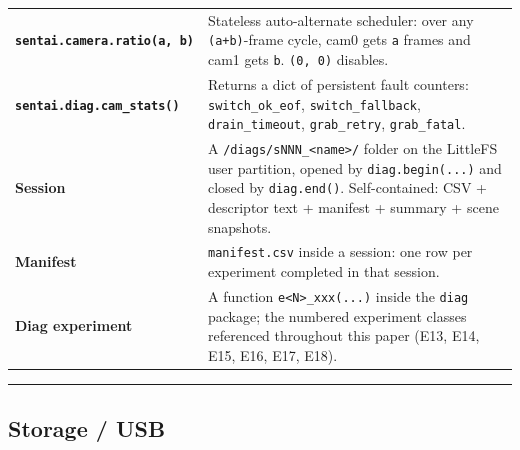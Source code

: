 {\begin{longtable}[]{@{}
  >{\raggedright\arraybackslash}p{}
  >{\raggedright\arraybackslash}p{}@{}}
\textbf{\texttt{sentai.camera.ratio(a,\ b)}} & Stateless auto-alternate
scheduler: over any \texttt{(a+b)}-frame cycle, cam0 gets \texttt{a}
frames and cam1 gets \texttt{b}. \texttt{(0,\ 0)} disables. \\
\textbf{\texttt{sentai.diag.cam\_stats()}} & Returns a dict of
persistent fault counters: \texttt{switch\_ok\_eof},
\texttt{switch\_fallback}, \texttt{drain\_timeout},
\texttt{grab\_retry}, \texttt{grab\_fatal}. \\
\textbf{Session} & A
\texttt{/diags/sNNN\_\textless{}name\textgreater{}/} folder on the
LittleFS user partition, opened by \texttt{diag.begin(...)} and closed
by \texttt{diag.end()}. Self-contained: CSV + descriptor text + manifest
+ summary + scene snapshots. \\
\textbf{Manifest} & \texttt{manifest.csv} inside a session: one row per
experiment completed in that session. \\
\textbf{Diag experiment} & A function
\texttt{e\textless{}N\textgreater{}\_xxx(...)} inside the \texttt{diag}
package; the numbered experiment classes referenced throughout this
paper (E13, E14, E15, E16, E17, E18). \\
\end{longtable}
}

\begin{center}\rule{0.5\linewidth}{0.5pt}\end{center}

\subsection{Storage / USB}\label{storage-usb}

